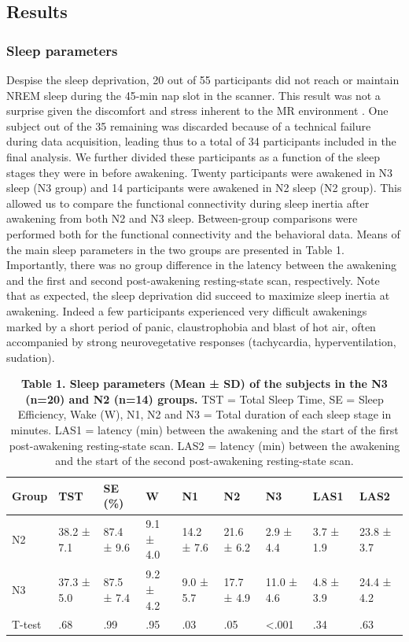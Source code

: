 \subsection*{Results}
\label{res:inertia:inertia:results}

\subsubsection*{Sleep parameters}
Despise the sleep deprivation, 20 out of 55 participants did not reach or maintain NREM sleep during the 45-min nap slot in the scanner. This result was not a surprise given the discomfort and stress inherent to the MR environment \citep{duyn_eeg-fmri_2012}. One subject out of the 35 remaining was discarded because of a technical failure during data acquisition, leading thus to a total of 34 participants included in the final analysis. We further divided these participants as a function of the sleep stages they were in before awakening. Twenty participants were awakened in N3 sleep (N3 group) and 14 participants were awakened in N2 sleep (N2 group). This allowed us to compare the functional connectivity during sleep inertia after awakening from both N2 and N3 sleep. Between-group comparisons were performed both for the functional connectivity and the behavioral data. Means of the main sleep parameters in the two groups are presented in Table 1. Importantly, there was no group difference in the latency between the awakening and the first and second post-awakening resting-state scan, respectively. Note that as expected, the sleep deprivation did succeed to maximize sleep inertia at awakening. Indeed a few participants experienced very difficult awakenings marked by a short period of panic, claustrophobia and blast of hot air, often accompanied by strong neurovegetative responses (tachycardia, hyperventilation, sudation).

\begin{table}[htb]
    \caption*{\textbf{Table 1. Sleep parameters (Mean ± SD) of the subjects in the N3 (n=20) and N2 (n=14) groups.} TST = Total Sleep Time, SE = Sleep Efficiency, Wake (W), N1, N2 and N3 = Total duration of each sleep stage in minutes. LAS1 = latency (min) between the awakening and the start of the first post-awakening resting-state scan. LAS2 = latency (min) between the awakening and the start of the second post-awakening resting-state scan.}
    \begin{tabularx}{\textwidth}{XXXXXXXXX}
    \toprule
    Group  & TST        & SE (\%)       & W         & N1         & N2         & N3          & LAS1      & LAS2 			\\ \midrule
    N2     & 38.2 ± 7.1 & 87.4 ± 9.6    & 9.1 ± 4.0 & 14.2 ± 7.6 & 21.6 ± 6.2 & 2.9 ± 4.4   & 3.7 ± 1.9 & 23.8 ± 3.7 	\\
    N3     & 37.3 ± 5.0 & 87.5 ± 7.4    & 9.2 ± 4.2 & 9.0 ± 5.7  & 17.7 ± 4.9 & 11.0 ± 4.6  & 4.8 ± 3.9 & 24.4 ± 4.2 	\\
    T-test & .68        & .99           & .95       & .03        & .05        & <.001       & .34       & .63 			\\ \bottomrule
    \end{tabularx}%
\end{table}

